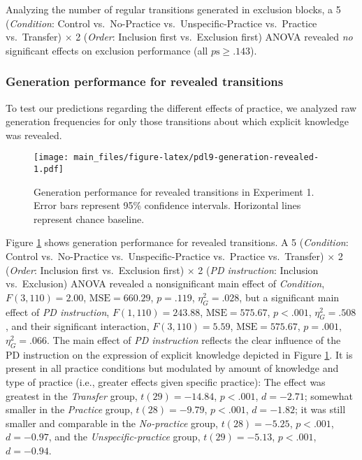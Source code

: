 \documentclass[man]{apa6}
\theoremstyle{definition}
\theoremstyle{definition}
\theoremstyle{definition}
\theoremstyle{remark}
\begin{document}
Analyzing the number of regular transitions generated in exclusion
blocks, a 5 (\emph{Condition}: Control vs.~No-Practice
vs.~Unspecific-Practice vs.~Practice vs.~Transfer) \(\times\) 2
(\emph{Order}: Inclusion first vs.~Exclusion first) ANOVA revealed
\emph{no} significant effects on exclusion performance (all
\(p\mathrm{s} \geq .143\)).

\subsubsection{Generation performance for revealed
transitions}\label{generation-performance-for-revealed-transitions}

To test our predictions regarding the different effects of practice, we
analyzed raw generation frequencies for only those transitions about
which explicit knowledge was revealed.

\begin{figure}[htbp]
\centering
\texttt{[image: main\_files/figure-latex/pdl9-generation-revealed-1.pdf]}
\caption{\label{fig:pdl9-generation-revealed}Generation performance for
revealed transitions in Experiment 1. Error bars represent 95\%
confidence intervals. Horizontal lines represent chance baseline.}
\end{figure}

Figure \ref{fig:pdl9-generation-revealed} shows generation performance
for revealed transitions. A 5 (\emph{Condition}: Control vs.~No-Practice
vs.~Unspecific-Practice vs.~Practice vs.~Transfer) \(\times\) 2
(\emph{Order}: Inclusion first vs.~Exclusion first) \(\times\) 2
(\emph{PD instruction}: Inclusion vs.~Exclusion) ANOVA revealed a
nonsignificant main effect of \emph{Condition}, \(F(3, 110) = 2.00\),
\(\mathrm{MSE} = 660.29\), \(p = .119\), \(\eta^2_G = .028\), but a
significant main effect of \emph{PD instruction},
\(F(1, 110) = 243.88\), \(\mathrm{MSE} = 575.67\), \(p < .001\),
\(\eta^2_G = .508\), and their significant interaction,
\(F(3, 110) = 5.59\), \(\mathrm{MSE} = 575.67\), \(p = .001\),
\(\eta^2_G = .066\). The main effect of \emph{PD instruction} reflects
the clear influence of the PD instruction on the expression of explicit
knowledge depicted in Figure \ref{fig:pdl9-generation-revealed}. It is
present in all practice conditions but modulated by amount of knowledge
and type of practice (i.e., greater effects given specific practice):
The effect was greatest in the \emph{Transfer} group,
\(t(29) = -14.84\), \(p < .001\), \(d = -2.71\); somewhat smaller in the
\emph{Practice} group, \(t(28) = -9.79\), \(p < .001\), \(d = -1.82\);
it was still smaller and comparable in the \emph{No-practice} group,
\(t(28) = -5.25\), \(p < .001\), \(d = -0.97\), and the
\emph{Unspecific-practice} group, \(t(29) = -5.13\), \(p < .001\),
\(d = -0.94\).
\end{document}
